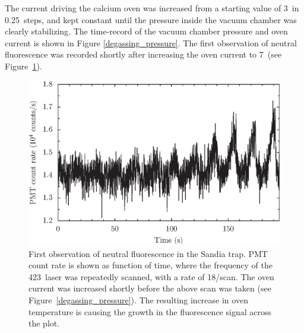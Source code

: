 The current driving the calcium oven was increased from a starting value of 3\A\, in 0.25\A\, steps, and kept constant until the pressure inside the vacuum chamber was clearly stabilizing. The time-record of the vacuum chamber pressure and oven current is shown in Figure \ref{degassing_pressure}. The first observation of neutral fluorescence was recorded shortly after increasing the oven current to 7\A\, (see Figure~\ref{firstsignal}).



\begin{figure}[t]
\centering
\includegraphics{chapter5/photion/firstlight_v2}
\caption[First observation of neutral fluorescence]{First observation of neutral fluorescence in the Sandia trap. PMT count rate  is shown as function of time, where the frequency of the 423\nm\, laser was repeatedly scanned, with a rate of 18\s/scan. The oven current was increased shortly before the above scan was taken (see Figure~\ref{degassing_pressure}). The resulting increase in oven temperature is causing the growth in the fluorescence signal across the plot.}
\label{firstsignal}
\end{figure} 



